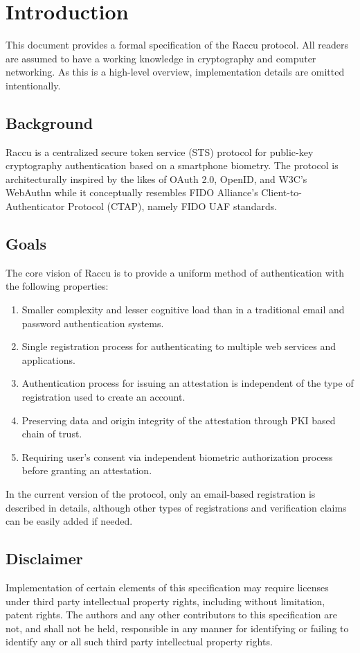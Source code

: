 \section{Introduction}
This document provides a formal specification of the Raccu protocol. All readers are assumed to have a working 
knowledge in cryptography and computer networking. As this is a high-level overview, implementation details are 
omitted intentionally.

    \subsection{Background}
    Raccu is a centralized secure token service (STS) protocol for public-key cryptography authentication 
    based on a smartphone biometry. The protocol is architecturally inspired by the likes of OAuth 2.0, OpenID, 
    and W3C's WebAuthn while it conceptually resembles FIDO Alliance's Client-to-Authenticator Protocol (CTAP), 
    namely FIDO UAF standards.

    \subsection{Goals}
    The core vision of Raccu is to provide a uniform method of authentication with the following properties: 
        \begin{enumerate}
            \item Smaller complexity and lesser cognitive load than in a traditional email and password 
                  authentication systems.
            \item Single registration process for authenticating to multiple web services and applications.
            \item Authentication process for issuing an attestation is independent of the type of registration 
                  used to create an account.
            \item Preserving data and origin integrity of the attestation through PKI based chain of trust.
            \item Requiring user's consent via independent biometric authorization process before granting an 
                  attestation.
        \end{enumerate}
    In the current version of the protocol, only an email-based registration is described in details, although 
    other types of registrations and verification claims can be easily added if needed.

    \subsection{Disclaimer}
    Implementation of certain elements of this specification may require licenses under third party intellectual 
    property rights, including without limitation, patent rights. The authors and any other contributors to this 
    specification are not, and shall not be held, responsible in any manner for identifying or failing to identify 
    any or all such third party intellectual property rights.    
    
